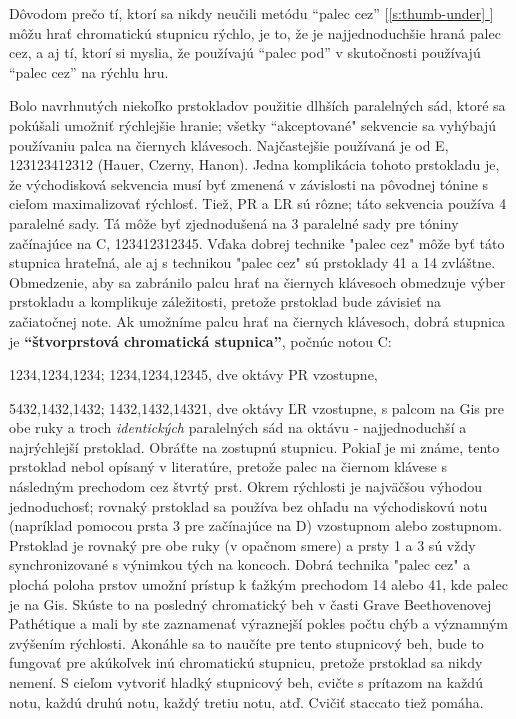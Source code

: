 \documentclass[11pt,a4paper]{book}
\newcommand*{\fullref}[1]{\hyperref[{#1}]{\ref*{#1} \nameref*{#1}}} %
\newcommand*{\fullrefp}[1]{[\fullref{#1}]} %
\begin{document}
Dôvodom prečo tí, ktorí sa nikdy neučili metódu “palec cez” \fullrefp{s:thumb-under} môžu hrať chromatickú stupnicu rýchlo, je to, že je najjednoduchšie hraná palec cez, a aj tí, ktorí si myslia, že používajú “palec pod” v skutočnosti používajú “palec cez” na rýchlu hru.

Bolo navrhnutých niekoľko prstokladov použitie dlhších paralelných sád, ktoré sa pokúšali umožniť rýchlejšie hranie; všetky “akceptované" sekvencie sa vyhýbajú používaniu palca na čiernych klávesoch. Najčastejšie používaná je od E, 123123412312 (Hauer, Czerny, ​​Hanon). Jedna komplikácia tohoto prstokladu je, že východisková sekvencia musí byť zmenená v závislosti na pôvodnej tónine s cieľom maximalizovať rýchlosť. Tiež, PR a ĽR sú rôzne; táto sekvencia používa 4 paralelné sady. Tá môže byť zjednodušená na 3 paralelné sady pre tóniny začínajúce na C, 123412312345. Vďaka dobrej technike "palec cez" môže byť táto stupnica hrateľná, ale aj s technikou "palec cez" sú prstoklady 41 a 14 zvláštne. Obmedzenie, aby sa zabránilo palcu hrať na čiernych klávesoch obmedzuje výber prstokladu a komplikuje záležitosti, pretože prstoklad bude závisieť na začiatočnej note. Ak umožníme palcu hrať na čiernych klávesoch, dobrá stupnica je \textbf{“štvorprstová chromatická stupnica”}, počnúc notou C:

1234,1234,1234; 1234,1234,12345, dve oktávy PR vzostupne,

5432,1432,1432; 1432,1432,14321, dve oktávy ĽR vzostupne, s palcom na Gis pre obe ruky a troch \emph{identických} paralelných sád na oktávu - najjednoduchší a najrýchlejší prstoklad. Obráťte na zostupnú stupnicu. Pokiaľ je mi známe, tento prstoklad nebol opísaný v literatúre, pretože palec na čiernom klávese s následným prechodom cez štvrtý prst. Okrem rýchlosti je najväčšou výhodou jednoduchosť; rovnaký prstoklad sa používa bez ohľadu na východiskovú notu (napríklad pomocou prsta 3 pre začínajúce na D) vzostupnom alebo zostupnom. Prstoklad je rovnaký pre obe ruky (v opačnom smere) a prsty 1 a 3 sú vždy synchronizované s výnimkou tých na koncoch. Dobrá technika "palec cez" a plochá poloha prstov umožní prístup k ťažkým prechodom 14 alebo 41, kde palec je na Gis. Skúste to na posledný chromatický beh v časti Grave Beethovenovej Pathétique a mali by ste zaznamenať výraznejší pokles počtu chýb a významným zvýšením rýchlosti. Akonáhle sa to naučíte pre tento stupnicový beh, bude to fungovať pre akúkoľvek inú chromatickú stupnicu, pretože prstoklad sa nikdy nemení. S cieľom vytvoriť hladký stupnicový beh, cvičte s prítazom na každú notu, každú druhú notu, každý tretiu notu, atď. Cvičiť staccato tiež pomáha.
\end{document}
